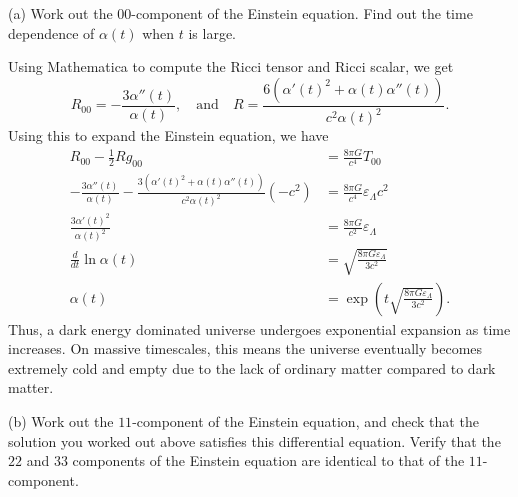 \documentclass{../../templates/lkx_pset}
\begin{document}
\begin{parts}
  \begin{part}{(a)}
    Work out the $00$-component of the Einstein equation. Find out the time dependence of $\alpha(t)$ when $t$ is large.
  \end{part}
  
  Using Mathematica to compute the Ricci tensor and Ricci scalar, we get
  \[
    R_{00} = -\frac{3\alpha''(t)}{\alpha(t)},\quad\textrm{and}\quad R = \frac{6(\alpha'(t)^2 + \alpha(t)\alpha''(t))}{c^2\alpha(t)^2}.
  \]
  Using this to expand the Einstein equation, we have
  \[
    \begin{aligned}
      R_{00} - \frac{1}{2}Rg_{00} 
      &= \frac{8\pi G}{c^4} T_{00}\\
      -\frac{3\alpha''(t)}{\alpha(t)} - \frac{3(\alpha'(t)^2 + \alpha(t)\alpha''(t))}{c^2\alpha(t)^2} (-c^2) 
      &= \frac{8\pi G}{c^4} \varepsilon_{\Lambda} c^2\\
      \frac{3\alpha'(t)^2}{\alpha(t)^2}
      &= \frac{8\pi G}{c^2}\varepsilon_\Lambda\\
      \frac{d}{dt}\ln \alpha(t) &= \sqrt{\frac{8\pi G \varepsilon_\Lambda}{3c^2}}\\
      \alpha(t) &= \exp\left(t\sqrt{\frac{8\pi G \varepsilon_\Lambda}{3c^2}}\right).
    \end{aligned}
  \]
  Thus, a dark energy dominated universe undergoes exponential expansion as time increases. On massive timescales, this means the universe eventually becomes extremely cold and empty due to the lack of ordinary matter compared to dark matter.

  \begin{part}{(b)}
    Work out the $11$-component of the Einstein equation, and check that the solution you worked out above satisfies this differential equation. Verify that the $22$ and $33$ components of the Einstein equation are identical to that of the $11$-component.
  \end{part}


\end{parts}
\end{document}
